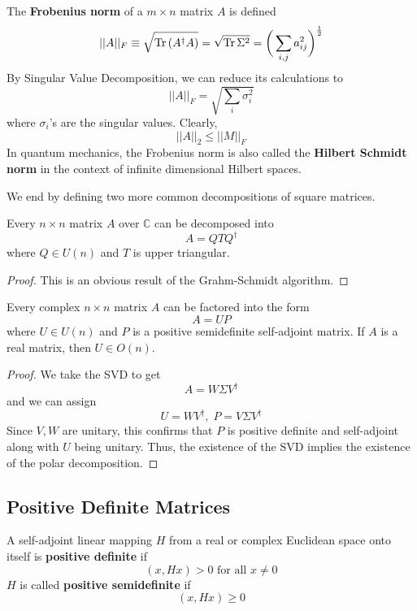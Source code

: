   \begin{definition}
  The \textbf{Frobenius norm} of a $m \times n$ matrix $A$ is defined
  \[||A||_F \equiv \sqrt{\Tr{(A^\dagger A)}} = \sqrt{\Tr{\Sigma^2}} = \bigg( \sum_{i, j} a_{i j}^2 \bigg)^{\frac{1}{2}} \]
  By Singular Value Decomposition, we can reduce its calculations to
  \[ ||A||_F = \sqrt{\sum_i \sigma_i^2}\]
  where $\sigma_i$'s are the singular values. Clearly, 
  \[||A||_2 \leq ||M||_F\]
  In quantum mechanics, the Frobenius norm is also called the \textbf{Hilbert Schmidt norm} in the context of infinite dimensional Hilbert spaces. 
  \end{definition}

  We end by defining two more common decompositions of square matrices. 

  \begin{theorem}
  Every $n \times n$ matrix $A$ over $\mathbb{C}$ can be decomposed into
  \[A = Q T Q^\dagger\]
  where $Q \in U(n)$ and $T$ is upper triangular. 
  \end{theorem}
  \begin{proof}
  This is an obvious result of the Grahm-Schmidt algorithm. 
  \end{proof}

  \begin{theorem}
  Every complex $n \times n$ matrix $A$ can be factored into the form
  \[A = U P\]
  where $U \in U(n)$ and $P$ is a positive semidefinite self-adjoint matrix. If $A$ is a real matrix, then $U \in O(n)$. 
  \end{theorem}
  \begin{proof}
  We take the SVD to get 
  \[A = W \Sigma V^\dagger\]
  and we can assign 
  \[U = W V^\dagger, \; P = V \Sigma V^\dagger\]
  Since $V, W$ are unitary, this confirms that $P$ is positive definite and self-adjoint along with $U$ being unitary. Thus, the existence of the SVD implies the existence of the polar decomposition. 
  \end{proof}

\subsection{Positive Definite Matrices}

  \begin{definition}
  A self-adjoint linear mapping $H$ from a real or complex Euclidean space onto itself is \textbf{positive definite} if 
  \[(x, H x) > 0 \text{ for all } x \neq 0\]
  $H$ is called \textbf{positive semidefinite} if 
  \[(x, H x) \geq 0\]
  \end{definition}

